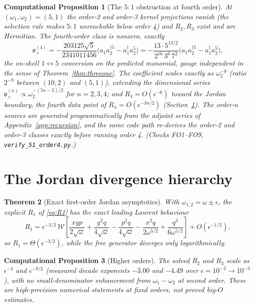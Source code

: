 \documentclass[11pt]{article}
\newtheorem{theorem}{Theorem}[section]
\newtheorem{cproposition}[theorem]{Computational Proposition}
\theoremstyle{definition}
\theoremstyle{remark}
\newcommand{\w}{\omega}
\newcommand{\dg}{\dagger}
\newcommand{\ob}{\mathfrak o}
\begin{document}
\begin{cproposition}[The $5{:}1$ obstruction at fourth order]
\label{cprop:fiveone}
At $(\w_1,\w_2)=(5,1)$ the order-2 and order-3 kernel projections
vanish (the selection rule makes $5{:}1$ unreachable below order 4)
and $R_2,R_3$ exist and are Hermitian.  The fourth-order class is
nonzero, exactly
\begin{equation}
\ob_+^{(4)}
=-\frac{203125\sqrt5}{2341011456}
\big(a_1a_2^{\dg5}-a_1^{\dg}a_2^5\big)
=-\frac{13\cdot5^{13/2}}{2^{16}\,3^6\,7^2}
\big(a_1a_2^{\dg5}-a_1^{\dg}a_2^5\big),
\end{equation}
the on-shell $1\leftrightarrow5$ conversion on the predicted monomial,
gauge independent in the sense of Theorem~\ref{thm:threeone}.  The
coefficient scales exactly as $\w_2^{-9}$ (ratio $2^{-9}$ between
$(10,2)$ and $(5,1)$), extending the dimensional series
$\ob_+^{(n)}\propto\w_2^{-(5n-2)/2}$ for $n=2,3,4$; and
$R_4=O(\epsilon^{-6})$ toward the Jordan boundary, the fourth data
point of $R_n=O(\epsilon^{-3n/2})$
(Section~\ref{sec:jordanscaling}).  The order-$n$ sources are
generated programmatically from the adjoint series of
Appendix~\ref{app:recursion}, and the same code path re-derives the
order-2 and order-3 classes exactly before running order 4.
(Checks FO1--FO9, \texttt{verify\_51\_order4.py}.)
\end{cproposition}

\section{The Jordan divergence hierarchy}\label{sec:jordanscaling}

\begin{theorem}[Exact first-order Jordan asymptotics]
\label{thm:jordanexact}
With $\w_{1,2}=\w\pm\epsilon$, the explicit $R_1$ of \eqref{eq:R1} has
the exact leading Laurent behaviour
\begin{equation}
R_1=\epsilon^{-3/2}\,\mathcal W\!\left[
\frac{xyp}{2\sqrt\w}+\frac{y^2q}{4\sqrt\w}-\frac{p^2q}{4\sqrt\w}
-\frac{x^2q}{2\w^{5/2}}+\frac{q^3}{6\w^{5/2}}
\right]+O(\epsilon^{-1/2}),
\end{equation}
so $R_1=\Theta(\epsilon^{-3/2})$, while the free generator diverges
only logarithmically.
\end{theorem}

\begin{cproposition}[Higher orders]\label{cprop:scaling}
The solved $R_2$ and $R_3$ scale as $\epsilon^{-3}$ and
$\epsilon^{-9/2}$ (measured decade exponents $-3.00$ and $-4.49$ over
$\epsilon=10^{-2}\to10^{-3}$), with no small-denominator enhancement
from $\w_1-\w_2$ at second order.  These are high-precision numerical
statements at fixed orders, not proved big-$O$ estimates.
\end{cproposition}
\end{document}
